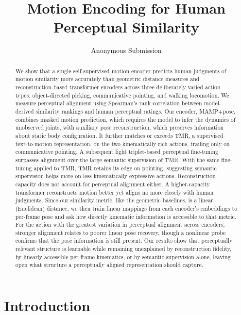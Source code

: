 \documentclass[letterpaper]{article} %
\title{Motion Encoding for Human Perceptual Similarity}
\author{Anonymous Submission}
\begin{document}
\maketitle

\begin{abstract}
We show that a single self-supervised motion encoder predicts human judgments of motion similarity more
accurately than geometric distance measures and reconstruction-based transformer encoders across three
deliberately varied action types: object-directed picking, communicative pointing, and walking
locomotion. We measure perceptual alignment using Spearman's rank correlation between model-derived
similarity rankings and human perceptual ratings. Our encoder, MAMP+pose, combines masked motion
prediction, which requires the model to infer the dynamics of unobserved joints, with auxiliary pose
reconstruction, which preserves information about static body configuration. It further matches or exceeds TMR, a 
supervised text-to-motion representation, on the two kinematically rich actions, trailing only on communicative pointing. 
A subsequent light triplet-based perceptual fine-tuning surpasses alignment over the large semantic supervision of TMR. With the same fine-tuning applied 
to TMR, TMR retains its edge on pointing, suggesting semantic supervision helps more on less kinematically expressive actions.
Reconstruction capacity does not account for perceptual alignment either. A higher-capacity transformer
reconstructs motion better yet aligns no more closely with human judgments. Since our similarity metric,
like the geometric baselines, is a linear (Euclidean) distance, we then train linear mappings from each
encoder's embeddings to per-frame pose and ask how directly kinematic information is accessible to that
metric. For the action with the greatest variation in perceptual alignment across encoders, stronger
alignment relates to poorer linear pose recovery, though a nonlinear probe confirms that the pose
information is still present. Our results show that perceptually relevant structure is learnable while
remaining unexplained by reconstruction fidelity, by linearly accessible per-frame kinematics, or by
semantic supervision alone, leaving open what structure a perceptually aligned representation should
capture.
\end{abstract}

\section{Introduction}
\end{document}
